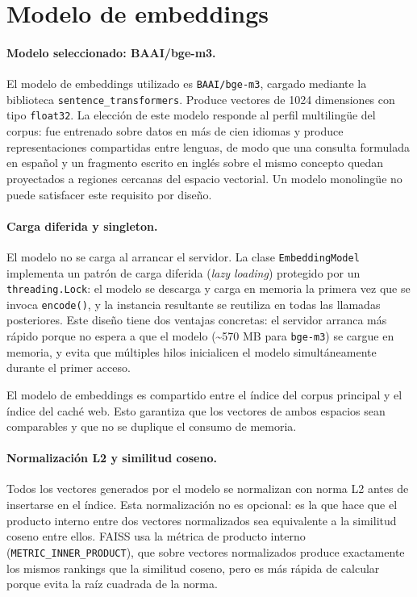 \documentclass[11pt]{article}
\begin{document}
\section{Modelo de embeddings}

\paragraph{Modelo seleccionado: BAAI/bge-m3.}
El modelo de embeddings utilizado es \texttt{BAAI/bge-m3}, cargado mediante la biblioteca
\texttt{sentence\_transformers}. Produce vectores de 1024 dimensiones con tipo
\texttt{float32}. La elección de este modelo responde al perfil multilingüe del corpus: fue
entrenado sobre datos en más de cien idiomas y produce representaciones compartidas entre
lenguas, de modo que una consulta formulada en español y un fragmento escrito en inglés sobre
el mismo concepto quedan proyectados a regiones cercanas del espacio vectorial. Un modelo
monolingüe no puede satisfacer este requisito por diseño.

\paragraph{Carga diferida y singleton.}
El modelo no se carga al arrancar el servidor. La clase \texttt{EmbeddingModel} implementa
un patrón de carga diferida (\emph{lazy loading}) protegido por un \texttt{threading.Lock}:
el modelo se descarga y carga en memoria la primera vez que se invoca \texttt{encode()}, y
la instancia resultante se reutiliza en todas las llamadas posteriores. Este diseño tiene dos
ventajas concretas: el servidor arranca más rápido porque no espera a que el modelo
(\textasciitilde{}570 MB para \texttt{bge-m3}) se cargue en memoria, y evita que múltiples
hilos inicialicen el modelo simultáneamente durante el primer acceso.

El modelo de embeddings es compartido entre el índice del corpus principal y el índice del
caché web. Esto garantiza que los vectores de ambos espacios sean comparables y que no se
duplique el consumo de memoria.

\paragraph{Normalización L2 y similitud coseno.}
Todos los vectores generados por el modelo se normalizan con norma L2 antes de insertarse
en el índice. Esta normalización no es opcional: es la que hace que el producto interno entre
dos vectores normalizados sea equivalente a la similitud coseno entre ellos. FAISS usa la
métrica de producto interno (\texttt{METRIC\_INNER\_PRODUCT}), que sobre vectores normalizados
produce exactamente los mismos rankings que la similitud coseno, pero es más rápida de calcular
porque evita la raíz cuadrada de la norma.
\end{document}

